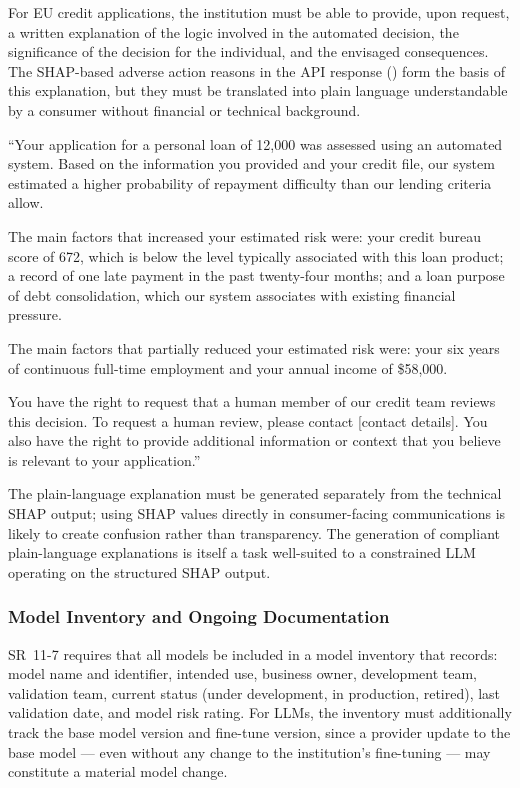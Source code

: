 \begin{context}
For EU credit applications, the institution must be able to provide, upon request, a written explanation of the logic involved in the automated decision, the significance of the decision for the individual, and the envisaged consequences. The SHAP-based adverse action reasons in the API response () form the basis of this explanation, but they must be translated into plain language understandable by a consumer without financial or technical background.

\begin{example}
\label{ex:gdpr-explanation}
``Your application for a personal loan of \texteuro{}12,000 was assessed using an automated system. Based on the information you provided and your credit file, our system estimated a higher probability of repayment difficulty than our lending criteria allow.

The main factors that increased your estimated risk were: your credit bureau score of 672, which is below the level typically associated with this loan product; a record of one late payment in the past twenty-four months; and a loan purpose of debt consolidation, which our system associates with existing financial pressure.

The main factors that partially reduced your estimated risk were: your six years of continuous full-time employment and your annual income of \$58,000.

You have the right to request that a human member of our credit team reviews this decision. To request a human review, please contact [contact details]. You also have the right to provide additional information or context that you believe is relevant to your application.''
\end{example}

The plain-language explanation must be generated separately from the technical SHAP output; using SHAP values directly in consumer-facing communications is likely to create confusion rather than transparency. The generation of compliant plain-language explanations is itself a task well-suited to a constrained LLM operating on the structured SHAP output.

\subsubsection*{Model Inventory and Ongoing Documentation}

SR~11-7 requires that all models be included in a model inventory that records: model name and identifier, intended use, business owner, development team, validation team, current status (under development, in production, retired), last validation date, and model risk rating. For LLMs, the inventory must additionally track the base model version and fine-tune version, since a provider update to the base model --- even without any change to the institution's fine-tuning --- may constitute a material model change.


\end{context}
